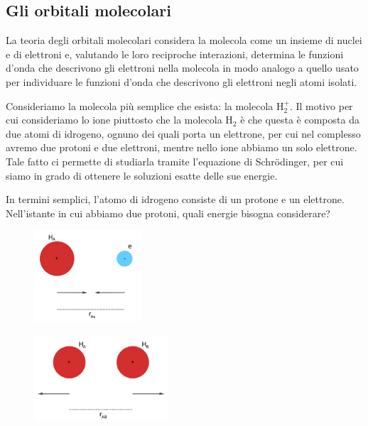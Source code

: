 \subsection{Gli orbitali molecolari}
La teoria degli orbitali molecolari considera la molecola come un insieme di nuclei e di elettroni e,
valutando le loro reciproche interazioni, determina le funzioni d'onda che descrivono gli elettroni nella
molecola in modo analogo a quello usato per individuare le funzioni d'onda che descrivono gli elettroni
negli atomi isolati.

\vspace{0.2cm}Consideriamo la molecola più semplice che esista: la molecola H$_2^+$. Il motivo per cui consideriamo lo ione piuttosto che la molecola H$_2$ è che questa è composta da due atomi di idrogeno, ognuno dei quali porta un elettrone, per cui nel complesso avremo due protoni e due elettroni, mentre nello ione abbiamo un solo elettrone. Tale fatto ci permette di studiarla tramite l'equazione di Schrödinger, per cui siamo in grado di ottenere le soluzioni esatte delle sue energie.

In termini semplici, l'atomo di idrogeno consiste di un protone e un elettrone. Nell'istante in cui abbiamo due protoni, quali energie bisogna considerare?

\hspace{1.5cm}\begin{minipage}{0.5\textwidth}
    \begin{figure}[H]
        \includegraphics[width=4cm]{immagini/attrazione protone-elettrone.png}
    \end{figure}
    \end{minipage} \hfill
    \begin{minipage}{0.5\textwidth}
    \begin{figure}[H]
        \includegraphics[width=5cm]{immagini/repulsione protone-protone.png}
    \end{figure}
    \end{minipage}

